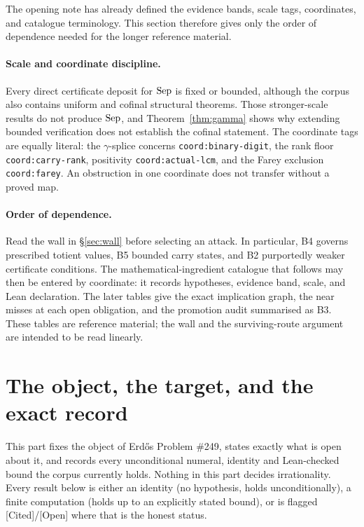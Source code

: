 \documentclass[11pt]{article}
\theoremstyle{breakplain}
\theoremstyle{breakdefinition}
\theoremstyle{breakdefinition}
\let\origmathrm\mathrm
\renewcommand{\mathrm}[1]{\ifmmode\origmathrm{#1}\else\textrm{#1}\fi}%
\newcommand{\ev}[1]{{\small\textsf{[#1]}}\xspace}
\newcommand{\coord}[1]{\texorpdfstring{{\small\nolinkurl{coord:#1}}}{coord:#1}\xspace}
\begin{document}
The opening note has already defined the evidence bands, scale tags,
coordinates, and catalogue terminology.  This section therefore gives only
the order of dependence needed for the longer reference material.

\paragraph{Scale and coordinate discipline.} Every direct certificate deposit
for $\mathrm{Sep}$ is fixed or bounded, although the corpus also contains
uniform and cofinal structural theorems.  Those stronger-scale results do not
produce $\mathrm{Sep}$, and Theorem~\ref{thm:gamma} shows why extending bounded
verification does not establish the cofinal statement.  The coordinate tags
are equally literal: the $\gamma$-splice concerns \coord{binary-digit}, the
rank floor \coord{carry-rank}, positivity \coord{actual-lcm}, and the Farey
exclusion \coord{farey}.  An obstruction in one coordinate does not transfer
without a proved map.

\paragraph{Order of dependence.} Read the wall in \S\ref{sec:wall} before
selecting an attack.  In particular, B4 governs prescribed totient values, B5
bounded carry states, and B2 purportedly weaker certificate conditions.  The
mathematical-ingredient catalogue that follows may then be entered by
coordinate: it records hypotheses, evidence band, scale, and Lean declaration.
The later tables give the exact implication graph, the near misses at each open
obligation, and the promotion audit summarised as B3.  These tables are
reference material; the wall and the surviving-route argument are intended to
be read linearly.
\section{The object, the target, and the exact record}

This part fixes the object of Erd\H{o}s Problem \#249, states exactly what is
open about it, and records every unconditional numeral, identity and
Lean-checked bound the corpus currently holds. Nothing in this part decides
irrationality. Every result below is either an identity (no hypothesis, holds
unconditionally), a finite computation (holds up to an explicitly stated
bound), or is flagged \ev{Cited}/\ev{Open} where that is the honest status.
\end{document}
